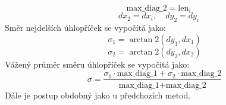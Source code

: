 \begin{equation}
    \quad \text{max\_diag\_2} = \text{len}_i
\end{equation}
\begin{equation}
    \quad dx_2 = dx_i, \quad dy_2 = dy_i
\end{equation}
Směr nejdelších úhlopříček se vypočítá jako:
\begin{equation}
    \sigma_1 = \arctan2(dy_1, dx_1)
\end{equation}
\begin{equation}
    \sigma_2 = \arctan2(dy_2, dx_2)
\end{equation}
Vážený průměr směru úhlopříček se vypočítá jako:
\begin{equation}
    \sigma = \frac{\sigma_1 \cdot \text{max\_diag\_1} + \sigma_2 \cdot \text{max\_diag\_2}}{\text{max\_diag\_1} + \text{max\_diag\_2}}
\end{equation}
Dále je postup obdobný jako u předchozích metod.
\newpage


